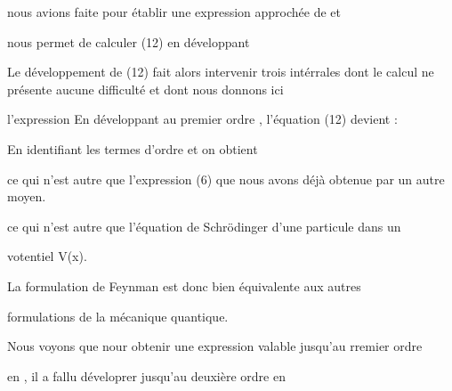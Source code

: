 nous avions faite pour établir une expression approchée de  et

nous permet de calculer (12) en développant 

Le développement de (12) fait alors intervenir trois intérrales
dont le calcul ne présente aucune difficulté et dont nous donnons ici

l'expression
%
En développant au premier ordre , l'équation
(12) devient : 

En identifiant les termes d'ordre et  on obtient

ce qui n'est autre que l'expression (6) que nous avons déjà obtenue par
un autre moyen.

ce qui n'est autre que l'équation de Schrödinger d'une particule dans un

votentiel V(x).

La formulation de Feynman est donc bien équivalente aux autres

formulations de la mécanique quantique.

Nous voyons que nour obtenir une expression valable jusqu'au rremier ordre

en , il a fallu déveloprer jusqu'au deuxière ordre en 
%

